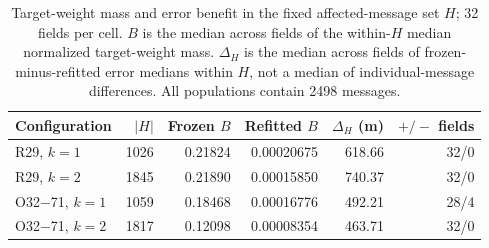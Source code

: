 \begin{table}[htbp]\centering\small
\caption{Target-weight mass and error benefit in the fixed affected-message set $H$; 32 fields per cell. $B$ is the median across fields of the within-$H$ median normalized target-weight mass. $\Delta_H$ is the median across fields of frozen-minus-refitted error medians within $H$, not a median of individual-message differences. All populations contain 2498 messages.}\label{tab:weights}
\begin{tabular}{lrrrrr}
\toprule Configuration & $|H|$ & Frozen $B$ & Refitted $B$ & $\Delta_H$ (m) & $+/-$ fields\\\midrule
R29, $k=1$ & 1026 & 0.21824 & 0.00020675 & 618.66 & 32/0\\
R29, $k=2$ & 1845 & 0.21890 & 0.00015850 & 740.37 & 32/0\\
O32$-$71, $k=1$ & 1059 & 0.18468 & 0.00016776 & 492.21 & 28/4\\
O32$-$71, $k=2$ & 1817 & 0.12098 & 0.00008354 & 463.71 & 32/0\\
\bottomrule
\end{tabular}\end{table}
